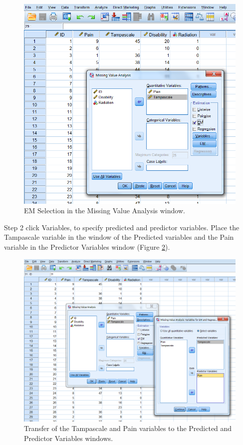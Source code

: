 \documentclass[]{book}
\theoremstyle{definition}
\theoremstyle{definition}
\theoremstyle{definition}
\theoremstyle{remark}
\begin{document}
\begin{figure}

{\centering \includegraphics[width=0.9\linewidth]{images/fig3.10} 

}

\caption{EM Selection in the Missing Value Analysis window.}\label{fig:fig3-10}
\end{figure}

Step 2 click Variables, to specify predicted and predictor variables.
Place the Tampascale variable in the window of the Predicted variables
and the Pain variable in the Predictor Variables window (Figure
\ref{fig:fig3-11}).

\begin{figure}

{\centering \includegraphics[width=0.9\linewidth]{images/fig3.11} 

}

\caption{Transfer of the Tampascale and Pain variables to the Predicted and Predictor Variables windows.}\label{fig:fig3-11}
\end{figure}
\end{document}
